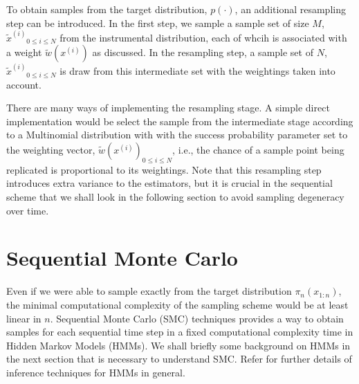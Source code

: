 To obtain samples from the target distribution, $p(\cdot)$, an additional resampling step can be introduced. In the first step, we sample a sample set of size $M$, ${\tilde{x}^{(i)}}_{0 \leq i \leq N}$ from the instrumental distribution, each of whcih is associated with a weight $\tilde{w}(x^{(i)})$ as discussed. In the resampling step, a sample set of $N$, ${\tilde{x}^{(i)}}_{0 \leq i \leq N}$ is draw from this intermediate set with the weightings taken into account. 

There are many ways of implementing the resampling stage. A simple direct implementation would be select the sample from the intermediate stage according to a Multinomial distribution with with the success probability parameter set to the weighting vector, $\tilde{w}(x^{(i)})_{0 \leq i \leq N}$, i.e., the chance of a sample point being replicated is proportional to its weightings. Note that this resampling step introduces extra variance to the estimators, but it is crucial in the sequential scheme that we shall look in the following section to avoid sampling degeneracy over time.

\section{Sequential Monte Carlo}
\label{sec:SMC}
Even if we were able to sample exactly from the target distribution $\pi_n(x_{1:n})$, the minimal computational complexity of the sampling scheme would be at least linear in $n$. Sequential Monte Carlo (SMC) techniques provides a way to obtain samples for each sequential time step in a fixed computational complexity time in Hidden Markov Models (HMMs). We shall briefly some background on HMMs in the next section that is necessary to understand SMC. Refer \cite{CO05} for further details of inference techniques for HMMs in general. 

